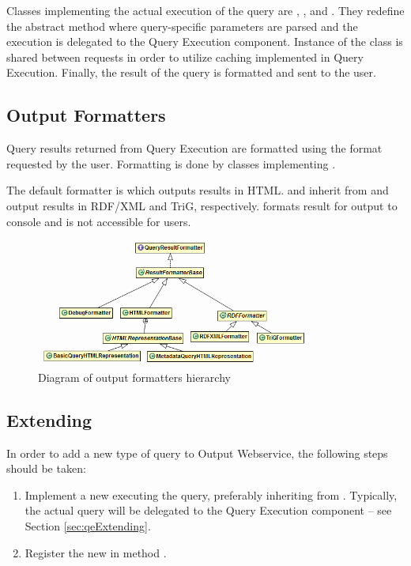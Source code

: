 Classes implementing the actual execution of the query are , ,  and \linebreak[4] . They redefine the abstract  method where query-specific parameters are parsed and the execution is delegated to the Query Execution component. Instance of the  class is shared between requests in order to utilize caching implemented in Query Execution. Finally, the result of the query is formatted and sent to the user.

\subsection{Output Formatters}
Query results returned from Query Execution are formatted using the format requested by the user. Formatting is done by classes implementing .

The default formatter is  which outputs results in HTML.  and  inherit from  and output results in RDF/XML and TriG, respectively.  formats result for output to console and is not accessible for users.

\begin{figure}[htb]
    \centering
    \includegraphics[width=0.8\textwidth]{images/dia-outputws-formatters.png}
    \caption{Diagram of output formatters hierarchy}
	\label{fig:outputwsFormatters}
\end{figure}

\subsection{Extending}
In order to add a new type of query to Output Webservice, the following steps should be taken:

\begin{enumerate}
	\item Implement a new  executing the query, preferably inheriting from \linebreak[4] . Typically, the actual query will be delegated to the Query Execution component -- see Section \ref{sec:qeExtending}.
	\item Register the new  in method .
\end{enumerate}


